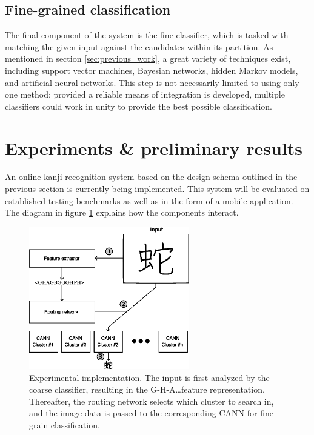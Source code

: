 \documentclass[10pt,conference,a4paper]{IEEEtran}
\begin{document}
	\subsection{Fine-grained classification}

	The final component of the system is the fine classifier, which is tasked with matching the
	given input against the candidates within its partition. As mentioned in section \ref{sec:previous_work}, a great
	variety of techniques exist, including support vector machines, Bayesian networks, hidden Markov models, and artificial neural networks.
	This step is not necessarily limited to using only one method; provided a reliable means of integration is developed,
	multiple classifiers could work in unity to provide the best possible classification.



	\section{Experiments \& preliminary results}
	\label{sec:experiments}

	An online kanji recognition system based on the design schema outlined in the previous section is
	currently being implemented. This system will be evaluated on established testing benchmarks
	as well as in the form of a mobile application. The diagram in figure \ref{fig_experimental_implementation} 
	explains how the components interact.

	\begin{figure}
		\centering
		\includegraphics[width=2.75in]{./fig/experimental-implementation.eps}
		\caption{Experimental implementation. The input is first analyzed by the coarse classifier, resulting in the G-H-A\ldots feature representation.
		Thereafter, the routing network selects which cluster to search in, and the image data is passed to the corresponding CANN for fine-grain classification.}
		\label{fig_experimental_implementation}
	\end{figure}
\end{document}

